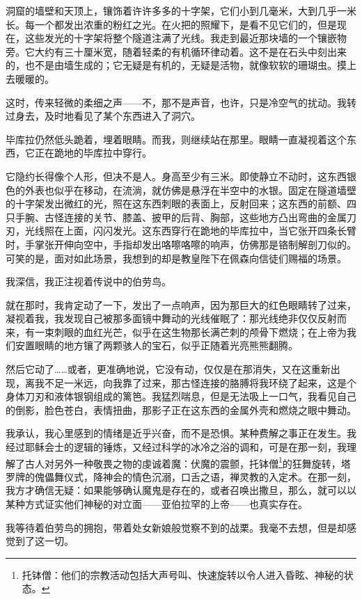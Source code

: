 \documentclass[AutoFakeBold=true]{book}
\begin{document}
洞窟的墙壁和天顶上，镶饰着许许多多的十字架，它们小到几毫米，大到几乎一米长。每一个都发出浓重的粉红之光。在火把的照耀下，是看不见它们的，但是现在，这些发光的十字架将整个隧道注满了光线。我走到最近那块墙的一个镶嵌物旁。它大约有三十厘米宽，随着轻柔的有机循环律动着。这不是在石头中刻出来的，也不是由墙生成的；它无疑是有机的，无疑是活物，就像软软的珊瑚虫。摸上去暖暖的。

这时，传来轻微的柔细之声——不，那不是声音，也许，只是冷空气的扰动。我转过身去，及时地看见了某个东西进入了洞穴。

毕库拉仍然低头跪着，埋着眼睛。而我，则继续站在那里。眼睛一直凝视着这个东西，它正在跪地的毕库拉中穿行。

它隐约长得像个人形，但决不是人。身高至少有三米。即使静立不动时，这东西银色的外表也似乎在移动，在流淌，就仿佛是悬浮在半空中的水银。固定在隧道墙壁的十字架发出微红的光，照在这东西刺眼的表面上，反射回来；这东西的前额、四只手腕、古怪连接的关节、膝盖、披甲的后背、胸部，这些地方凸出弯曲的金属刀刃，光线照在上面，闪闪发光。这东西穿行在跪地的毕库拉中，当它张开四条长臂时，手掌张开伸向空中，手指却发出咯嚓咯嚓的响声，仿佛那是铬制解剖刀似的。可笑的是，面对如此场景，我想到的却是教皇陛下在佩森向信徒们赐福的场景。

我深信，我正注视着传说中的伯劳鸟。

就在那时，我肯定动了一下，发出了一点响声，因为那巨大的红色眼睛转了过来，凝视着我，我发现自己被那多面镜中舞动的光线催眠了：那光线绝非仅仅反射而来，有一束刺眼的血红光芒，似乎在这生物那长满芒刺的颅骨下燃烧；在上帝为我们安置眼睛的地方镶了两颗骇人的宝石，似乎正随着光亮熊熊翻腾。

然后它动了……或者，更准确地说，它没有动，仅仅是在那消失，又在这重新出现，离我不足一米远，向我靠了过来，那古怪连接的胳膊将我环绕了起来，这是个身体刀刃和液体银钢组成的篱笆。我猛烈喘息，但是无法吸上一口气，我看见自己的倒影，脸色苍白，表情扭曲，那影子正在这东西的金属外壳和燃烧之眼中舞动。

我承认，我心里感到的情绪是近乎兴奋，而不是恐惧。某种费解之事正在发生。我经过耶稣会士的逻辑的锤炼，又经过科学的冰冷之浴的调和，可是在那一刻，我理解了古人对另外一种敬畏之物的虔诚着魔：伏魔的震颤，托钵僧\footnote{托钵僧：他们的宗教活动包括大声号叫、快速旋转以令人进入昏眩、神秘的状态。}的狂舞旋转，塔罗牌的傀儡舞仪式，降神会的情色沉溺，口舌之语，禅灵教的入定术。在那一刻，我方才确信无疑：如果能够确认魔鬼是存在的，或者召唤出撒旦，那么，就可以以某种方式证实他们神秘的对立面——亚伯拉罕的上帝——也真实存在。

我等待着伯劳鸟的拥抱，带着处女新娘般觉察不到的战栗。我毫不去想，但是却感觉到了这一切。
\end{document}
